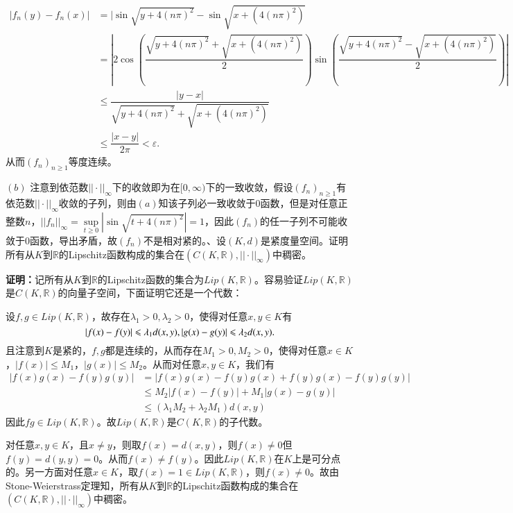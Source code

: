 \documentclass[12pt,fancyhdr,UTF8,openany]{ctexart}
\begin{document}
\[\begin{aligned}
	|f_n(y)-f_n(x)|&=|\sin\sqrt{y+4(n\pi)^2}-\sin\sqrt{x+(4(n\pi)^2)}\\
	               &=|2\cos(\dfrac{\sqrt{y+4(n\pi)^2}+\sqrt{x+(4(n\pi)^2)}}{2})\sin(\dfrac{\sqrt{y+4(n\pi)^2}-\sqrt{x+(4(n\pi)^2)}}{2})|\\
	               &\leqslant\dfrac{|y-x|}{\sqrt{y+4(n\pi)^2}+\sqrt{x+(4(n\pi)^2)}}\\
                   &\leqslant \dfrac{|x-y|}{2\pi}<\varepsilon.	              
\end{aligned}\]
从而$(f_n)_{n\geqslant 1}$等度连续。\par 
$(b)$ 注意到依范数$||\cdot||_\infty$下的收敛即为在$[0,\infty)$下的一致收敛，假设$(f_n)_{n\geqslant1}$有依范数$||\cdot||_\infty$收敛的子列，则由$(a)$知该子列必一致收敛于0函数，但是对任意正整数$n$，$||f_n||_\infty=\sup\limits_{t\geqslant0}|\sin\sqrt{t+4(n\pi)^2}|=1$，因此$(f_n)$的任一子列不可能收敛于0函数，导出矛盾，故$(f_n)$不是相对紧的。、设$(K,d)$是紧度量空间。证明所有从$K$到$\mathbb{R}$的Lipschitz函数构成的集合在$(C(K,\mathbb{R}),||\cdot||_{\infty})$中稠密。\par 
\textbf{证明：}记所有从$K$到$\mathbb{R}$的Lipschitz函数的集合为$Lip(K,\mathbb{R})$。容易验证$Lip(K,\mathbb{R})$是$C(K,\mathbb{R})$的向量子空间，下面证明它还是一个代数：\par 
设$f,g\in Lip(K,\mathbb{R})$，故存在$\lambda_1>0,\lambda_2>0$，使得对任意$x,y\in K$有
\[ |f(x)-f(y)|\leqslant \lambda_1 d(x,y),\\
|g(x)-g(y)|\leqslant \lambda_2 d(x,y). \]且注意到$K$是紧的，$f,g$都是连续的，从而存在$M_1>0,M_2>0$，使得对任意$x\in K$，$|f(x)|\leqslant M_1$，$|g(x)|\leqslant M_2$。从而对任意$x,y\in K$，我们有
\[\begin{aligned} 
	|f(x)g(x)-f(y)g(y)|&=|f(x)g(x)-f(y)g(x)+f(y)g(x)-f(y)g(y)|\\
	                   &\leqslant M_2 |f(x)-f(y)|+M_1 |g(x)-g(y)|\\
	                   &\leqslant (\lambda_1 M_2+\lambda_2 M_1)d(x,y)
\end{aligned}\]
因此$fg\in Lip(K,\mathbb{R})$。故$Lip(K,\mathbb{R})$是$C(K,\mathbb{R})$的子代数。\par 
对任意$x,y\in K$，且$x\not= y$，则取$f(x)=d(x,y)$，则$f(x)\not= 0$但$f(y)=d(y,y)=0$。从而$f(x)\not= f(y)$。因此$Lip(K,\mathbb{R})$在$K$上是可分点的。另一方面对任意$x\in K$，取$f(x)=1\in Lip(K,\mathbb{R})$，则$f(x)\not=0$。故由Stone-Weierstrass定理知，所有从$K$到$\mathbb{R}$的Lipschitz函数构成的集合在$(C(K,\mathbb{R}),||\cdot||_{\infty})$中稠密。\par
\end{document}
